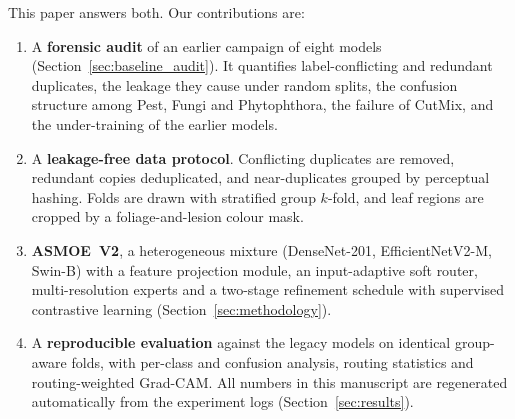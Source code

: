 This paper answers both. Our contributions are:
\begin{enumerate}[1.]
  \item A \textbf{forensic audit} of an earlier campaign of eight models
  (Section~\ref{sec:baseline_audit}). It quantifies label-conflicting and redundant duplicates, the
  leakage they cause under random splits, the confusion structure among Pest, Fungi and
  Phytophthora, the failure of CutMix, and the under-training of the earlier models.
  \item A \textbf{leakage-free data protocol}. Conflicting duplicates are removed, redundant copies
  deduplicated, and near-duplicates grouped by perceptual hashing. Folds are drawn with stratified
  group $k$-fold, and leaf regions are cropped by a foliage-and-lesion colour mask.
  \item \textbf{ASMOE~V2}, a heterogeneous mixture (DenseNet-201, EfficientNetV2-M, Swin-B) with a
  feature projection module, an input-adaptive soft router, multi-resolution experts and a
  two-stage refinement schedule with supervised contrastive learning
  (Section~\ref{sec:methodology}).
  \item A \textbf{reproducible evaluation} against the legacy models on identical group-aware folds,
  with per-class and confusion analysis, routing statistics and routing-weighted Grad-CAM. All
  numbers in this manuscript are regenerated automatically from the experiment logs
  (Section~\ref{sec:results}).
\end{enumerate}
